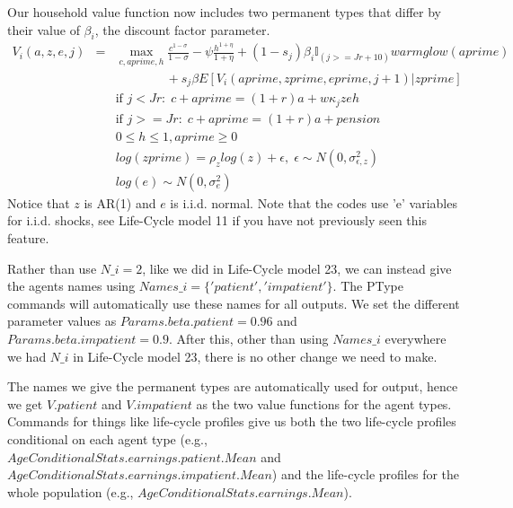 Our household value function now includes two permanent types that differ by their value of $\beta_i$, the discount factor parameter.
\begin{eqnarray*}
 V_i(a,z,e,j)&=& \max_{c,aprime,h} \frac{c^{1-\sigma}}{1-\sigma} - \psi \frac{h^{1+\eta}}{1+\eta} + (1-s_j)\beta_i  \mathbb{I}_{(j>=Jr+10)} warmglow(aprime)     \\
 && \quad \quad  \quad \quad + s_j \beta E[V_i(aprime,zprime,eprime,j+1)|zprime] \\
&& \text{if }j<Jr: \; c+aprime=(1+r)a+w \kappa_j z e h \\
&& \text{if }j>=Jr: \; c+aprime=(1+r)a +pension\\
&& 0\leq h \leq 1, aprime\geq 0 \\
&& log(zprime)=\rho_{z} log(z) + \epsilon, \; \epsilon \sim N(0,\sigma_{\epsilon,z}^2) \\
&& log(e) \sim N(0,\sigma_{e}^2)
\end{eqnarray*}
Notice that $z$ is AR(1) and $e$ is i.i.d. normal. Note that the codes use 'e' variables for i.i.d. shocks, see Life-Cycle model 11 if you have not previously seen this feature.

Rather than use $N\_{}i=2$, like we did in Life-Cycle model 23, we can instead give the agents names using $Names\_{}i=\{'patient','impatient'\}$. The PType commands will automatically use these names for all outputs. We set the different parameter values as $Params.beta.patient=0.96$ and $Params.beta.impatient=0.9$. After this, other than using $Names\_{}i$ everywhere we had $N\_{}i$ in Life-Cycle model 23, there is no other change we need to make.

The names we give the permanent types are automatically used for output, hence we get $V.patient$ and $V.impatient$ as the two value functions for the agent types. Commands for things like life-cycle profiles give us both the two life-cycle profiles conditional on each agent type (e.g., $AgeConditionalStats.earnings.patient.Mean$ and $AgeConditionalStats.earnings.impatient.Mean$) and the life-cycle profiles for the whole population (e.g., $AgeConditionalStats.earnings.Mean$).






